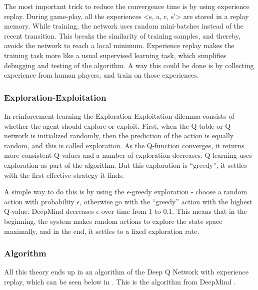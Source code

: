 The most important trick to reduce the convergence time is by using experience replay. During game-play, all the experiences <s, a, r, s’> are stored in a replay memory. While training, the network uses random mini-batches instead of the recent transition. This breaks the similarity of training samples, and thereby, avoids the network to reach a local minimum. Experience replay makes the training task more like a usual supervised learning task, which simplifies debugging and testing of the algorithm. A way this could be done is by collecting experience from human players, and train on those experiences.
  
\subsubsection{Exploration-Exploitation}
In reinforcement learning the Exploration-Exploitation dilemma consists of whether the agent should explore or exploit. First, when the Q-table or Q-network is initialized randomly, then the prediction of the action is equally random, and this is called exploration. As the Q-function converges, it returns more consistent Q-values and a number of exploration decreases. Q-learning uses exploration as part of the algorithm. But this exploration is “greedy”, it settles with the first effective strategy it finds. 

A simple way to do this is by using the $\epsilon$-greedy exploration - choose a random action with probability $\epsilon$, otherwise go with the “greedy” action with the highest Q-value. DeepMind decreases $\epsilon$ over time from 1 to 0.1. This means that in the beginning, the system makes random actions to explore the state space maximally, and in the end, it settles to a fixed exploration rate.

\subsubsection{Algorithm}
All this theory ends up in an algorithm of the Deep Q Network with experience replay, which can be seen below in . This is the algorithm from DeepMind \cite{DBLP:journals/corr/MnihKSGAWR13}.

